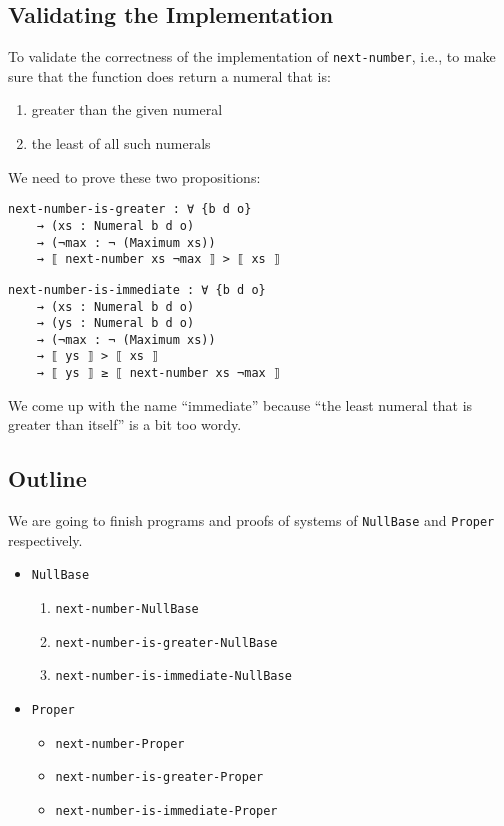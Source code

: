 \documentclass[\main/thesis.tex]{subfiles}
\begin{document}
\subsection{Validating the Implementation}

To validate the correctness of the implementation of {\lstinline|next-number|},
i.e., to make sure that the function does return a numeral that is:

\begin{enumerate}
    \item greater than the given numeral
    \item the least of all such numerals
\end{enumerate}

We need to prove these two propositions:

\begin{lstlisting}
next-number-is-greater : ∀ {b d o}
    → (xs : Numeral b d o)
    → (¬max : ¬ (Maximum xs))
    → ⟦ next-number xs ¬max ⟧ > ⟦ xs ⟧
\end{lstlisting}

\begin{lstlisting}
next-number-is-immediate : ∀ {b d o}
    → (xs : Numeral b d o)
    → (ys : Numeral b d o)
    → (¬max : ¬ (Maximum xs))
    → ⟦ ys ⟧ > ⟦ xs ⟧
    → ⟦ ys ⟧ ≥ ⟦ next-number xs ¬max ⟧
\end{lstlisting}

We come up with the name ``immediate''
because ``the least numeral that is greater than itself'' is a bit too wordy.

\subsection{Outline}

We are going to finish programs and proofs of systems of {\lstinline|NullBase|}
and {\lstinline|Proper|} respectively.

\begin{itemize}
    \item {\lstinline|NullBase|}
        \begin{enumerate}
            \item {\lstinline|next-number-NullBase|}
            \item {\lstinline|next-number-is-greater-NullBase|}
            \item {\lstinline|next-number-is-immediate-NullBase|}
        \end{enumerate}
    \item {\lstinline|Proper|}
        \begin{itemize}
            \item {\lstinline|next-number-Proper|}
            \item {\lstinline|next-number-is-greater-Proper|}
            \item {\lstinline|next-number-is-immediate-Proper|}
        \end{itemize}
\end{itemize}
\end{document}
